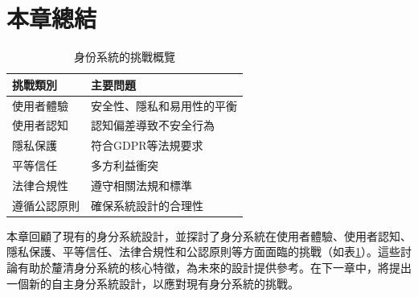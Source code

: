 \section{本章總結}
\begin{table}[h]
  \centering
  \begin{tabular}{|p{}|p{}|}
    \hline
    \textbf{挑戰類別} & \textbf{主要問題} \\
    \hline
    使用者體驗         & 安全性、隱私和易用性的平衡 \\
    \hline
    使用者認知         & 認知偏差導致不安全行為   \\
    \hline
    隱私保護          & 符合GDPR等法規要求   \\
    \hline
    平等信任          & 多方利益衝突        \\
    \hline
    法律合規性         & 遵守相關法規和標準     \\
    \hline
    遵循公認原則        & 確保系統設計的合理性    \\
    \hline
  \end{tabular}
  \caption{身份系統的挑戰概覽}
  \label{tab:identity-system-challenges}
\end{table}
本章回顧了現有的身分系統設計，並探討了身分系統在使用者體驗、使用者認知、隱私保護、平等信任、法律合規性和公認原則等方面面臨的挑戰（如表\ref{tab:identity-system-challenges}）。這些討論有助於釐清身分系統的核心特徵，為未來的設計提供參考。在下一章中，將提出一個新的自主身分系統設計，以應對現有身分系統的挑戰。